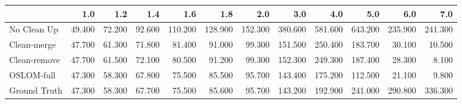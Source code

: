 \begin{tabular}{lrrrrrrrrrrr}
\toprule
{} &    1.0 &    1.2 &    1.4 &     1.6 &     1.8 &     2.0 &     3.0 &     4.0 &     5.0 &     6.0 &     7.0 \\
\midrule
No Clean Up  & 49.400 & 72.200 & 92.600 & 110.200 & 128.900 & 152.300 & 380.600 & 581.600 & 643.200 & 235.900 & 241.300 \\
Clean-merge  & 47.700 & 61.300 & 71.800 &  81.400 &  91.000 &  99.300 & 151.500 & 250.400 & 183.700 &  30.100 &  10.500 \\
Clean-remove & 47.700 & 61.500 & 72.100 &  80.500 &  91.200 &  99.300 & 152.300 & 249.300 & 187.400 &  28.300 &   8.100 \\
OSLOM-full   & 47.300 & 58.300 & 67.800 &  75.500 &  85.500 &  95.700 & 143.400 & 175.200 & 112.500 &  21.100 &   9.800 \\
Ground Truth & 47.300 & 58.300 & 67.700 &  75.500 &  85.600 &  95.700 & 143.200 & 192.900 & 241.000 & 290.800 & 336.300 \\
\bottomrule
\end{tabular}
